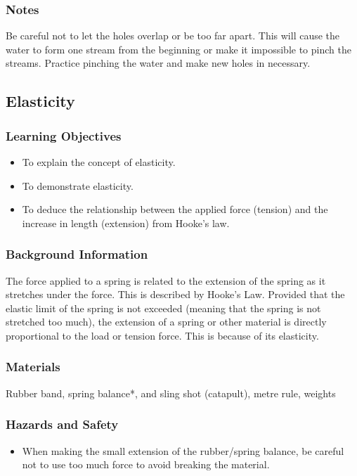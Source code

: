 \subsubsection*{Notes}
Be careful not to let the holes overlap or be too far apart. This will cause the water to form one stream from the beginning or make it impossible to pinch the streams. Practice pinching the water and make new holes in necessary.

\subsection{Elasticity}

\subsubsection*{Learning Objectives}
\begin{itemize}
\item{To explain the concept of elasticity.} 
\item{To demonstrate elasticity.} 
\item{To deduce the relationship between the applied force (tension) and the increase in length (extension) from Hooke's law.} 
\end{itemize}

\subsubsection*{Background Information}
The force applied to a spring is related to the extension of the spring as it stretches under the force. This is described by Hooke's Law. Provided that the elastic limit of the spring is not exceeded (meaning that the spring is not stretched too much), the extension of a spring or other material is directly proportional to the load or tension force. This is because of its elasticity.

\subsubsection*{Materials}
Rubber band, spring balance*, and sling shot (catapult), metre rule, weights

\subsubsection*{Hazards and Safety}
\begin{itemize}
\item{When making the small extension of the rubber/spring balance, be careful not to use too much force to avoid breaking the material.} 
\end{itemize}

